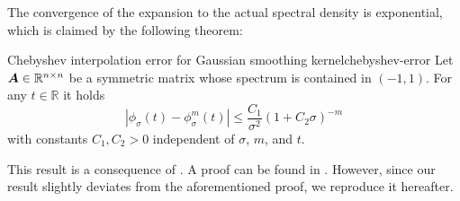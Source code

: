 The convergence of the expansion to the actual spectral density is exponential, 
which is claimed by the following theorem:
\begin{theorem}{Chebyshev interpolation error for Gaussian smoothing kernel}{chebyshev-error}
    Let $\boldsymbol{A} \in \mathbb{R}^{n \times n}$ be a symmetric matrix whose spectrum
    is contained in $(-1, 1)$. For any $t \in \mathbb{R}$ it holds
    \begin{equation}
        \left|  \phi_{\sigma}(t) - \phi_{\sigma}^m(t) \right| \leq \frac{C_1}{\sigma^2}(1 + C_2 \sigma)^{-m}
        \label{equ:2-chebyshev-interpolation-error}
    \end{equation}
    with constants $C_1, C_2 > 0$ independent of $\sigma$, $m$, and $t$.
\end{theorem}
This result is a consequence of .
A proof can be found in \cite[theorem~2]{lin2017randomized}. However, since our
result slightly deviates from the aforementioned proof, we reproduce it hereafter.
